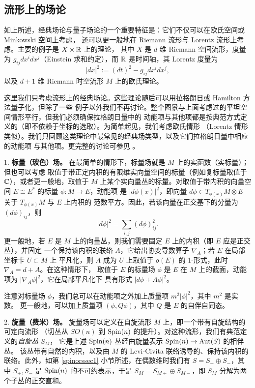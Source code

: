 \subsection{流形上的场论} \label{manif} 

如上所述，经典场论与量子场论的一个重要特征是：它们不仅可以在欧氏空间或 Minkowski 空间上考虑，
还可以更一般地在 Riemann 流形与 Lorentz 流形上考虑。主要的例子是 $X\times \Bbb R$ 上的理论，
其中 $X$ 是 $d$ 维 Riemann 空间流形，度量为 $g_{ij}dx^i dx^j$（Einstein 求和约定），而 $\Bbb R$
是时间轴，其 Lorentz 度量为
$$
|dx|^2:=(dt)^2-g_{ij}dx^i dx^j,
$$ 
以及 $d+1$ 维 Riemann 时空流形 $M$ 上的欧氏理论。

这里我们只考虑流形上的经典场论。这些理论随后可以用拉格朗日或 Hamilton 方法量子化，但除了一些
例子以外我们不再讨论。整个图景与上面考虑过的平坦空间情形平行，但我们必须确保拉格朗日量中的
动能项与其他项都是按典范方式定义的（即不依赖于坐标的选取）。为简单起见，我们考虑欧氏情形
（Lorentz 情形类似）。我们只回顾这类理论中最常见的经典场类型，以及它们拉格朗日量中相应的动能项
与其他项。更完整的讨论可参见 \cite{QFS}。

1. \textbf{标量（玻色）场。} 在最简单的情形下，标量场就是 $M$ 上的实函数（实标量）；但也可以考虑
取值于带正定内积的有限维实向量空间的标量（例如复标量取值于 $\Bbb C$），或者更一般地，取值于
$M$ 上某个实向量丛的标量。对取值于带内积的向量空间 $E\cong E^*$ 的标量 $\phi: M\to E$，动能项
是 $|d\phi(x)|^2$，即向量 $d\phi\in T_{\phi(x)}M\otimes E$ 关于 $T_{\phi(x)}M$ 与 $E$ 上内积的
范数平方。因此，若该向量在正交基下的分量为 $(d\phi)_{ij}$，则
$$
|d\phi|^2=\sum_{i,j}(d\phi)_{ij}^2.
$$
更一般地，若 $E$ 是 $M$ 上的向量丛，则我们需要固定 $E$ 上的内积（即 $E$ 应是正交丛），并固定
一个保持该内积的联络 $A$，它给出协变导数算子 $\nabla_A$；若 $E$ 在局部坐标卡 $U\subset M$ 上
平凡化，则 $A$ 成为 $U$ 上取值于 $\mathfrak{o}(E)$ 的 1-形式，此时 $\nabla_A=d+A$。在这种情形下，
取值于 $E$ 的标量场 $\phi$ 是 $E$ 在 $M$ 上的截面，动能项为 $|\nabla_A \phi|^2$，它在局部平凡化下
具有形式 $|d\phi+A\phi|^2$。

注意对标量场 $\phi$，我们总可以在动能项之外加上质量项 $m^2|\phi|^2$，其中 $m^2$ 是实数。
更一般地，可以加上质量项 $(\phi, Q\phi)$，其中 $Q$ 是 $E$ 的自伴自同态。

2. \textbf{旋量（费米）场。} 旋量场可以定义在自旋流形 $M$ 上，即一个带有自旋结构的可定向流形
（切丛从 $SO(n)$ 到 ${\rm Spin}(n)$ 的提升）。对这种流形，我们有典范定义的\emph{自旋丛} $S_M$，
它是上述 ${\rm Spin}(n)$ 丛经由旋量表示 ${\rm Spin}(n)\to {\rm Aut}(S)$ 的相伴丛。
该丛带有自然的内积，以及由 $M$ 的 Levi-Civita 联络诱导的、保持该内积的联络。此外，如第
\ref{spinorssec1} 小节所述，在偶数维时我们有 $S=S_+\oplus S_-$，其中 $S_+,S_-$ 是
${\rm Spin}(n)$ 的不可约表示，于是 $S_M=S_{M+}\oplus S_{M-}$，即 $S_M$ 分解为两个子丛的正交直和。


